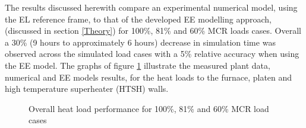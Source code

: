 \documentclass{webofc}
\begin{document}
The results discussed herewith compare an experimental numerical model, using the EL reference frame, to that of the developed EE modelling approach, (discussed in section \ref{Theory}) for 100\%, 81\% and 60\% MCR loads cases. Overall a 30\% (9 hours to approximately 6 hours) decrease in simulation time was observed across the simulated load cases with a 5\% relative accuracy when using the EE model. The graphs of figure \ref{fig_heat_load} illustrate the measured plant data, numerical and EE models results,  for the heat loads to the furnace, platen and high temperature superheater (HTSH) walls. 
\begin{figure}[h!]
\centering
{}
\hspace{5mm}
\hspace{5mm}
\setlength{\belowcaptionskip}{0pt}
\caption{Overall heat load performance for 100\%, 81\% and 60\% MCR load cases}
\label{fig_heat_load}
\end{figure}
\end{document}
